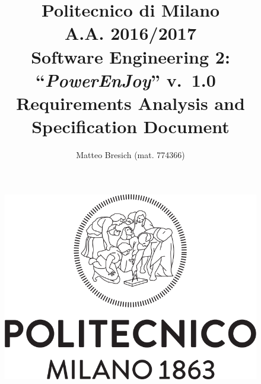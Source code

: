 \documentclass{article}
\newcommand{\version}{\mbox{\normalfont v. 1.0 }}
\begin{document}
	\title{Politecnico di Milano\\A.A. 2016/2017\\Software Engineering 2: ``{\em PowerEnJoy}'' \version \\ \bigskip \textbf{R}equirements \textbf{A}nalysis and \textbf{S}pecification \textbf{D}ocument}
	\author{Matteo Bresich (mat. 774366)}
	
	
	
	\begin{figure}[t]
		\centering
		\includegraphics[width=\linewidth]{"img/logo-polimi"}
		\label{fig:polimi-logo}
	\end{figure}

	\maketitle
	
	\thispagestyle{empty}
	\clearpage\mbox{}\thispagestyle{empty}\clearpage
	
	\renewcommand*\thesection{\arabic{section}}
	\renewcommand*\thesubsection{\arabic{section}.\arabic{subsection}}
	\renewcommand*\thesubsubsection{%
		\arabic{section}.\arabic{subsection}.\arabic{subsubsection}%
	}
	\setcounter{secnumdepth}{4}
	\setcounter{tocdepth}{4}
	
	\renewcommand{\contentsname}{Table of Content}
	\tableofcontents
	
\end{document}

